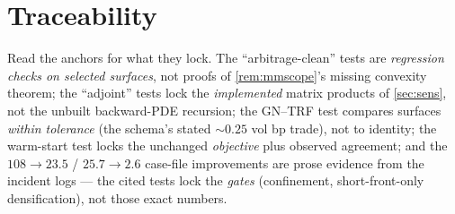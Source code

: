 \documentclass[11pt]{article}
\begin{document}
\section{Traceability}
\label{sec:traceability}

Read the anchors for what they lock. The ``arbitrage-clean'' tests are
\emph{regression checks on selected surfaces}, not proofs of
\cref{rem:mmscope}'s missing convexity theorem; the ``adjoint'' tests lock
the \emph{implemented} matrix products of \cref{sec:sens}, not the unbuilt
backward-PDE recursion; the GN--TRF test compares surfaces \emph{within
tolerance} (the schema's stated $\sim0.25$ vol bp trade), not to identity;
the warm-start test locks the unchanged \emph{objective} plus observed
agreement; and the $108\to23.5$ / $25.7\to2.6$ case-file improvements are
prose evidence from the incident logs --- the cited tests lock the
\emph{gates} (confinement, short-front-only densification), not those exact
numbers.
\end{document}
